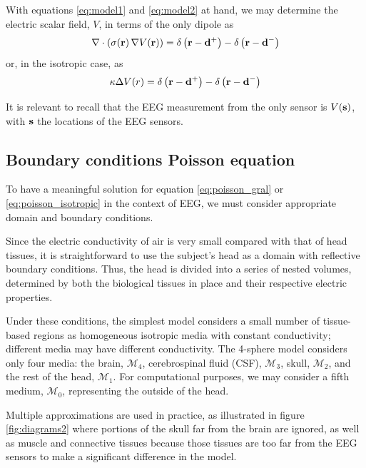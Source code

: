 With equations \eqref{eq:model1} and \eqref{eq:model2} at hand, we may determine the electric scalar field, $V$, in terms of the only dipole as
\begin{equation}
\nabla \cdot\left( \sigma(\mathbf{r})\, \nabla V(\mathbf{r})  \right) = 
{\delta\left( \mathbf{r}-\mathbf{d}^+ \right) - \delta\left( \mathbf{r}-\mathbf{d}^- \right)}
\label{eq:poisson_gral}
\end{equation}
or, in the isotropic case, as
\begin{equation}
\kappa \Delta V(r) = 
{\delta\left( \mathbf{r}-\mathbf{d}^+ \right) - \delta\left( \mathbf{r}-\mathbf{d}^- \right)}
\label{eq:poisson_isotropic}
\end{equation}

It is relevant to recall that the EEG measurement from the only sensor is $V(\mathbf{s})$, with $\mathbf{s}$ the locations of the EEG sensors.


\subsection{Boundary conditions Poisson equation}

To have a meaningful solution for equation \eqref{eq:poisson_gral} or \eqref{eq:poisson_isotropic} in the context of EEG, we must consider appropriate domain and boundary conditions.

Since the electric conductivity of air is very small compared with that of head tissues, it is straightforward to use the subject's head as a domain with reflective boundary conditions. 
%
Thus, the head is divided into a series of nested volumes, determined by both the biological tissues in place and their respective electric properties.

Under these conditions, the simplest model considers a small number of tissue-based regions as homogeneous isotropic media with constant conductivity; different media may have different conductivity.
%
The 4-sphere model considers only four media: the brain, $\mathcal{M}_4$, cerebrospinal fluid (CSF), $\mathcal{M}_3$, skull, $\mathcal{M}_2$, and the rest of the head, $\mathcal{M}_1$.
%
For computational purposes, we may consider a fifth medium, $\mathcal{M}_0$, representing the outside of the head.

Multiple approximations are used in practice, as illustrated in figure \ref{fig:diagrams2} where portions of the skull far from the brain are ignored, as well as muscle and connective tissues 
because those tissues are too far from the EEG sensors to make a significant difference in the model.


